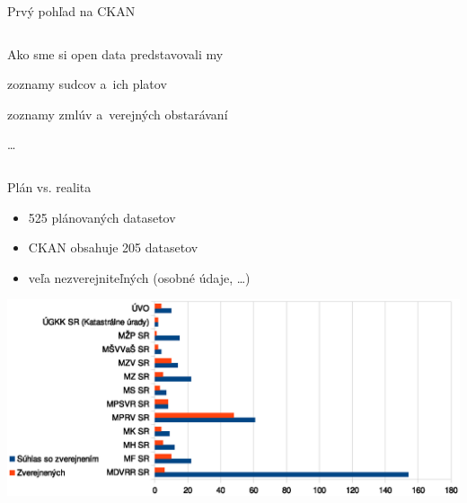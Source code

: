 \documentclass[slovak,14pt,utf8]{beamer}
\begin{document}
\begin{frame}{Prvý pohľad na CKAN}
    \begin{columns}
            \begin{block}{Ako sme si open data predstavovali my}
                \item zoznamy sudcov a~ich platov
                \item zoznamy zmlúv a~verejných obstarávaní
                \item \dots
            \end{block}
    \end{columns}
\end{frame}

\begin{frame}{Plán vs. realita}
    \begin{itemize}
        \item 525 plánovaných datasetov
        \item CKAN obsahuje 205 datasetov
        \item veľa nezverejniteľných (osobné údaje, \dots)
    \end{itemize}
    \includegraphics[width=\textwidth]{zverejnene_prevadzkovatel}
\end{frame}
\end{document}
